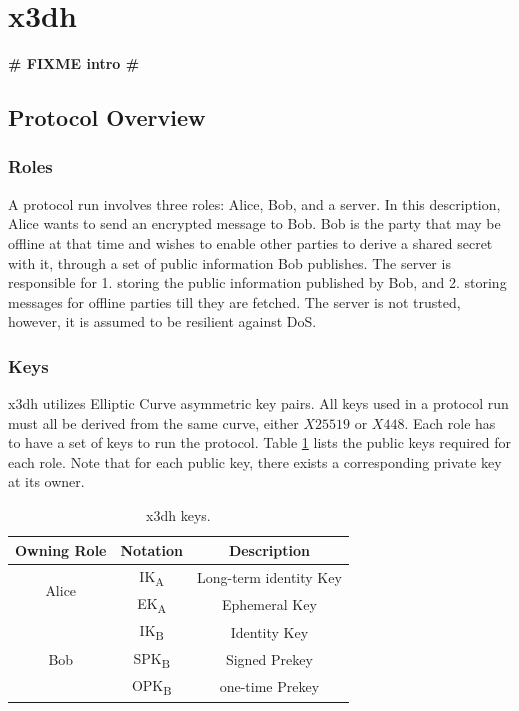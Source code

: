 \section{\acrfull*{x3dh}}
\textbf{\LARGE \# FIXME intro \#}
\label{ch:x3dh}

\subsection{Protocol Overview}
\subsubsection{Roles}
A protocol run involves three roles: Alice, Bob, and a server. In this description, Alice wants to send an encrypted message to Bob. Bob is the party that may be offline at that time and wishes to enable other parties to derive a shared secret with it, through a set of public information Bob publishes. The server is responsible for 1. storing the public information published by Bob, and 2. storing messages for offline parties till they are fetched. The server is not trusted, however, it is assumed to be resilient against DoS. %
\subsubsection{Keys}
\gls{x3dh} utilizes Elliptic Curve asymmetric key pairs. All keys used in a protocol run must all be derived from the same curve, either $X25519$ or $X448$. Each role has to have a set of keys to run the protocol. Table \ref{tab:x3dhkeys} lists the public keys required for each role. Note that for each public key, there exists a corresponding private key at its owner.

\begin{table}
	\centering
	\begin{tabular}{|c||c|c|}
		
		\hline
		Owning Role & Notation				 & Description 			  \\\hline
		\multirow{2}{*}{Alice} & IK\textsubscript{A} 	 & Long-term identity Key \\
		& EK\textsubscript{A} 	 & Ephemeral Key 		  \\\hline
		\multirow{3}{*}{Bob}  & IK\textsubscript{B} 	 & Identity Key 		  \\
		& SPK\textsubscript{B} 	 & Signed Prekey 		  \\
		& OPK\textsubscript{B} 	 & one-time Prekey 		  \\ \hline
		
	\end{tabular}
	\caption{\gls{x3dh} keys.}
	\label{tab:x3dhkeys}
\end{table}

